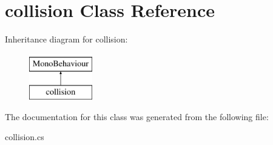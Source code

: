 \hypertarget{classcollision}{}\section{collision Class Reference}
\label{classcollision}
Inheritance diagram for collision\+:\begin{figure}[H]
\begin{center}
\leavevmode
\includegraphics[height=2.000000cm]{classcollision}
\end{center}
\end{figure}


The documentation for this class was generated from the following file\+:\begin{DoxyCompactItemize}
\item 
collision.\+cs\end{DoxyCompactItemize}
